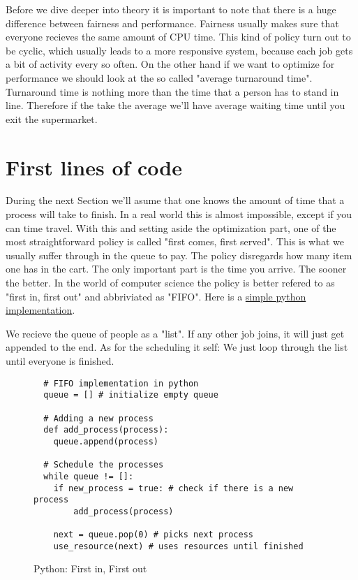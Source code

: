 Before we dive deeper into theory it is important to note that there is a huge difference between fairness and performance.
Fairness usually makes sure that everyone recieves the same amount of CPU time.
This kind of policy turn out to be cyclic, which usually leads to a more responsive system, because each job gets a bit of activity every so often.
On the other hand if we want to optimize for performance we should look at the so called "average turnaround time".
Turnaround time is nothing more than the time that a person has to stand in line.
Therefore if the take the average we'll have average waiting time until you exit the supermarket.

\section{First lines of code}

During the next Section we'll asume that one knows the amount of time that a process will take to finish.
In a real world this is almost impossible, except if you can time travel.
With this and setting aside the optimization part, one of the most straightforward policy is called "first comes, first served".
This is what we usually suffer through in the queue to pay.
The policy disregards how many item one has in the cart.
The only important part is the time you arrive.
The sooner the better.
In the world of computer science the policy is better refered to as "first in, first out" and abbriviated as "FIFO".
Here is a \hyperref[code:fifo]{simple python implementation}.

We recieve the queue of people as a "list".
If any other job joins, it will just get appended to the end.
As for the scheduling it self:
We just loop through the list until everyone is finished.

\begin{figure}[h]
\begin{verbatim}
  # FIFO implementation in python
  queue = [] # initialize empty queue

  # Adding a new process
  def add_process(process):
    queue.append(process)

  # Schedule the processes
  while queue != []:
    if new_process = true: # check if there is a new process
        add_process(process)
    
    next = queue.pop(0) # picks next process
    use_resource(next) # uses resources until finished
\end{verbatim}
\caption{Python: First in, First out}
\label{code:fifo}
\end{figure}



